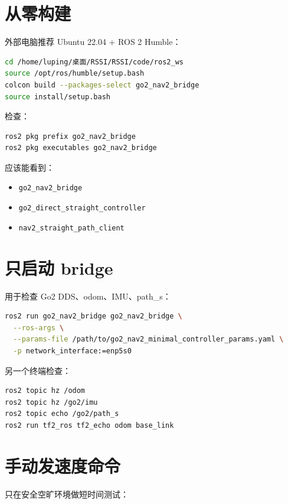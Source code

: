 \documentclass[UTF8,11pt,a4paper,openany]{ctexrep}
\newcommand{\code}[1]{\nolinkurl{#1}}
\begin{document}
\section{从零构建}

外部电脑推荐 Ubuntu 22.04 + ROS 2 Humble：

\begin{lstlisting}[language=bash]
cd /home/luping/桌面/RSSI/RSSI/code/ros2_ws
source /opt/ros/humble/setup.bash
colcon build --packages-select go2_nav2_bridge
source install/setup.bash
\end{lstlisting}

检查：

\begin{lstlisting}[language=bash]
ros2 pkg prefix go2_nav2_bridge
ros2 pkg executables go2_nav2_bridge
\end{lstlisting}

应该能看到：

\begin{itemize}
  \item \code{go2_nav2_bridge}
  \item \code{go2_direct_straight_controller}
  \item \code{nav2_straight_path_client}
\end{itemize}

\section{只启动 bridge}

用于检查 Go2 DDS、odom、IMU、path\_s：

\begin{lstlisting}[language=bash]
ros2 run go2_nav2_bridge go2_nav2_bridge \
  --ros-args \
  --params-file /path/to/go2_nav2_minimal_controller_params.yaml \
  -p network_interface:=enp5s0
\end{lstlisting}

另一个终端检查：

\begin{lstlisting}[language=bash]
ros2 topic hz /odom
ros2 topic hz /go2/imu
ros2 topic echo /go2/path_s
ros2 run tf2_ros tf2_echo odom base_link
\end{lstlisting}

\section{手动发速度命令}

只在安全空旷环境做短时间测试：
\end{document}
